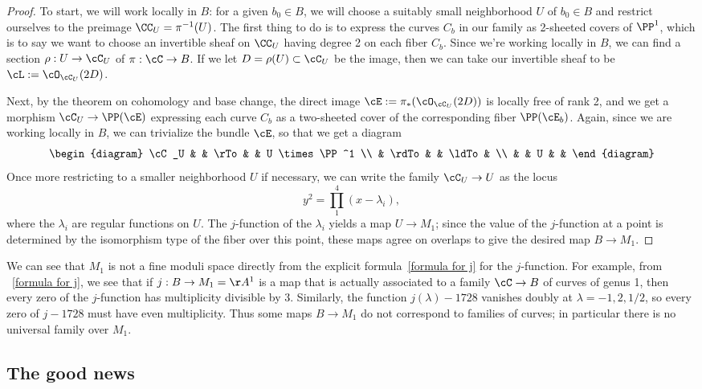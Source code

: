 \begin{proof}
To start, we will work locally in $B$: for a given $b_0 \in B$, we will choose a suitably small neighborhood $U$ of $b_0 \in B$ and restrict ourselves to the preimage $\CC_U = \pi^{-1}(U)$. The first thing to do is to express the curves $C_b$ in our family as 2-sheeted covers of $\PP^1$, which is to say we want to choose an invertible sheaf on $\CC_U$ having degree 2 on each fiber $C_b$. Since we're working locally in $B$,
we can find a section $\rho : U \to \cC_U$ of $\pi : \cC \to B$. If we let $D = \rho(U) \subset \cC_U$ be the image, then we can take our invertible sheaf to be $\cL := \cO_{\cC_U}(2D)$.

Next, by the theorem on cohomology and base change, the direct image $\cE := \pi_*(\cO_{\cC_U}(2D))$ is locally free of rank 2, and we get a morphism $\cC_U \to \PP(\cE)$ expressing each curve $C_b$ as a two-sheeted cover of the corresponding fiber $\PP(\cE_b)$. Again, since we are working locally in $B$, we can trivialize the bundle $\cE$, so that we get a diagram
$$
\begin{diagram}
\cC_U & & \rTo & & U \times \PP^1 \\
& \rdTo & & \ldTo & \\
& & U & &
\end{diagram} 
$$
Once more restricting to a smaller neighborhood $U$ if necessary, we can write the family $\cC_U \to U$ as the locus
$$
y^2 = \prod_1^4 (x - \lambda_i),
$$
where the $\lambda_i$ are regular functions on $U$. The $j$-function of the $\lambda_i$  yields a map $U \to M_1$; since the value of the $j$-function at a point is determined by the isomorphism type of the fiber over this point, these maps agree on overlaps to give  the desired map $B \to M_1$.
\end{proof}


We can see that $M_1$ is not a fine moduli space directly from the explicit formula~\ref{formula for j} for the $j$-function. For example, from ~\ref{formula for j}, we see that if $j : B \to M_1 = \AA^1$ is a map that is actually associated to a family $\cC \to B$ of curves of genus 1, then every zero of the $j$-function has multiplicity divisible by 3.  Similarly, the function $j(\lambda)-1728$ vanishes doubly at $\lambda = -1, 2, 1/2$, so every zero of $j - 1728$ must have even multiplicity. Thus some maps $B\to M_1$ do not correspond to families of curves; in particular there is no universal family over $M_1$. 

\subsection{The good news}

